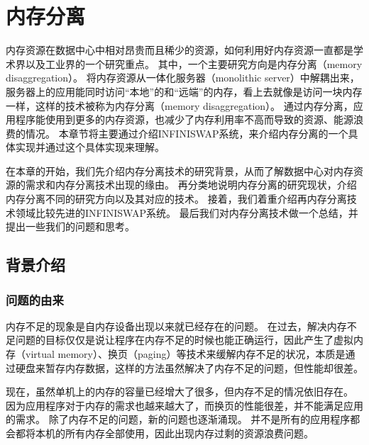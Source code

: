 
\chapter{内存分离} %

\label{Chapter2} %

%

内存资源在数据中心中相对昂贵而且稀少的资源，如何利用好内存资源一直都是学术界以及工业界的一个研究重点。
其中，一个主要研究方向是内存分离（memory disaggregation）。
将内存资源从一体化服务器（monolithic server）中解耦出来，服务器上的应用能同时访问“本地”的和“远端”的内存，看上去就像是访问一块内存一样，这样的技术被称为内存分离（memory disaggregation）。
通过内存分离，应用程序能使用到更多的内存资源，也减少了内存利用率不高而导致的资源、能源浪费的情况。
本章节将主要通过介绍INFINISWAP系统，来介绍内存分离的一个具体实现并通过这个具体实现来理解。

在本章的开始，我们先介绍内存分离技术的研究背景，从而了解数据中心对内存资源的需求和内存分离技术出现的缘由。
再分类地说明内存分离的研究现状，介绍内存分离不同的研究方向以及其对应的技术。
接着，我们着重介绍再内存分离技术领域比较先进的INFINISWAP系统\cite{gu2017efficient}。
最后我们对内存分离技术做一个总结，并提出一些我们的问题和思考。


\section{背景介绍}

\subsection{问题的由来}
内存不足的现象是自内存设备出现以来就已经存在的问题。
在过去，解决内存不足问题的目标仅仅是说让程序在内存不足的时候也能正确运行，因此产生了虚拟内存（virtual memory）、换页（paging）等技术来缓解内存不足的状况，本质是通过硬盘来暂存内存数据，这样的方法虽然解决了内存不足的问题，但性能却很差。

现在，虽然单机上的内存的容量已经增大了很多，但内存不足的情况依旧存在。
因为应用程序对于内存的需求也越来越大了，而换页的性能很差，并不能满足应用的需求。
除了内存不足的问题，新的问题也逐渐涌现。
并不是所有的应用程序都会都将本机的所有内存全部使用，因此出现内存过剩的资源浪费问题。


